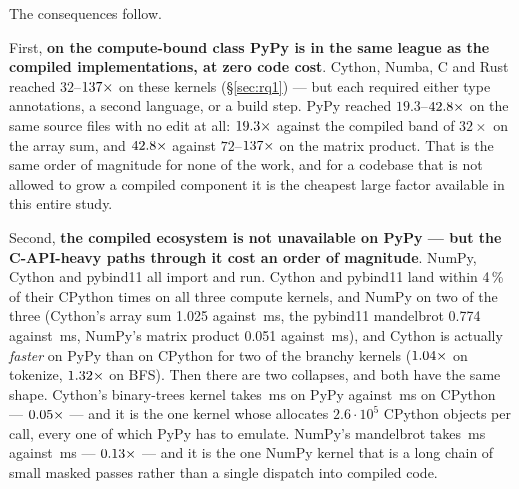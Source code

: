 The consequences follow.

First, \textbf{on the compute-bound class PyPy is in the same league as the compiled
implementations, at zero code cost}. Cython, Numba, C and Rust reached $32$--$\meas{ratio:b1_compute-314:matmul/cpython_loop|b1_compute-314:matmul/numba_fastmath}{137}\times$ on
these kernels (\S\ref{sec:rq1}) --- but each required either type annotations, a second
language, or a build step. PyPy reached $19.3$--$\meas{ratio:b1_compute-314:matmul/cpython_loop|b1_compute-pypy311:matmul/cpython_loop}{42.8}\times$ on the same source files with no
edit at all: $\meas{ratio:b1_compute-314:arraysum/cpython_loop|b1_compute-pypy311:arraysum/cpython_loop}{19.3}\times$ against the compiled band of $32\times$ on the array sum, and
$\meas{ratio:b1_compute-314:matmul/cpython_loop|b1_compute-pypy311:matmul/cpython_loop}{42.8}\times$ against $72$--$\meas{ratio:b1_compute-314:matmul/cpython_loop|b1_compute-314:matmul/numba_fastmath}{137}\times$ on the matrix product. That is the same order of
magnitude for none of the work, and for a codebase that is not allowed to grow a compiled
component it is the cheapest large factor available in this entire study.

Second, \textbf{the compiled ecosystem is not unavailable on PyPy --- but the C-API-heavy paths
through it cost an order of magnitude}. NumPy, Cython and pybind11 all import and run. Cython
and pybind11 land within 4\,\% of their CPython times on all three compute kernels, and NumPy on
two of the three (Cython's array sum 1.025 against \,ms, the pybind11 mandelbrot 0.774
against \,ms, NumPy's matrix product 0.051 against \,ms), and Cython is actually
\emph{faster} on PyPy than on CPython for two of the branchy kernels ($\meas{ratio:b2_branchy-314:tokenize/cython|b2_branchy-pypy311:tokenize/cython}{1.04}\times$ on tokenize,
$\meas{ratio:b2_branchy-314:bfs/cython|b2_branchy-pypy311:bfs/cython}{1.32}\times$ on BFS).
Then there are two collapses, and both have the same shape. Cython's binary-trees kernel takes
\,ms on PyPy against \,ms on CPython --- $\meas{ratio:b2_branchy-314:binarytrees/cython|b2_branchy-pypy311:binarytrees/cython}{0.05}\times$ --- and it is the one kernel
whose  allocates $2.6\cdot10^5$ CPython objects per call, every one of which PyPy
has to emulate. NumPy's mandelbrot takes \,ms against \,ms --- $\meas{ratio:b1_compute-314:mandelbrot/numpy|b1_compute-pypy311:mandelbrot/numpy}{0.13}\times$ --- and it
is the one NumPy kernel that is a long chain of small masked passes rather than a single
dispatch into compiled code.

